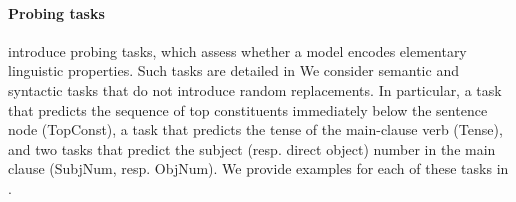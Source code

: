 \paragraph{Probing tasks} \textcite{conneau_18} introduce probing tasks, which assess whether a model encodes elementary linguistic properties. Such tasks are detailed in  We consider semantic and syntactic tasks that do not introduce random replacements. In particular, a task that predicts the sequence of top constituents immediately below the sentence node (TopConst), a task that predicts the tense of the main-clause verb (Tense), and two tasks that predict the subject (resp. direct object) number in the main clause (SubjNum, resp. ObjNum). We provide examples for each of these tasks in .

\begin{table}[!htb]
\footnotesize
{}

\end{table}
